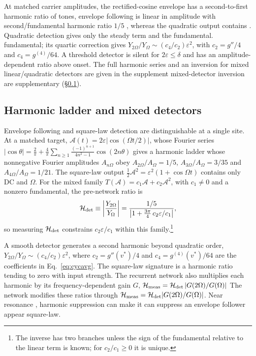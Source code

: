 \documentclass[11pt,a4paper]{article}
\newif\ifjne
\newcommand{\half}{\tfrac{1}{2}}
\providecommand{\DIFaddtex}[1]{{\protect\color{blue} \sf #1}} %
\providecommand{\DIFdeltex}[1]{{\protect\color{red} \scriptsize #1}} %
\providecommand{\DIFaddbegin}{} %
\providecommand{\DIFaddend}{} %
\providecommand{\DIFdelbegin}{} %
\providecommand{\DIFdelend}{} %
\providecommand{\DIFadd}[1]{\texorpdfstring{\DIFaddtex{#1}}{#1}} %
\providecommand{\DIFdel}[1]{\texorpdfstring{\DIFdeltex{#1}}{}} %
\begin{document}
At matched \DIFdelbegin \DIFdel{carrier amplitudes, the rectified-cosine envelope has a
second-to-first harmonic ratio of }\DIFdelend \DIFaddbegin \DIFadd{tones, envelope following is linear in amplitude with
second/fundamental harmonic ratio }\DIFaddend $1/5$\DIFdelbegin \DIFdel{, whereas the quadratic output contains
}\DIFdelend \DIFaddbegin \DIFadd{. Quadratic detection gives }\DIFaddend only
the steady term and \DIFdelbegin \DIFdel{the fundamental. }\DIFdelend \DIFaddbegin \DIFadd{fundamental; its quartic correction gives
$Y_{2\Omega}/Y_\Omega\sim(c_4/c_2)\varepsilon^2$, with
$c_2=g''/4$ and $c_4=g^{(4)}/64$. A threshold detector is silent for
$2\varepsilon\le\delta$ and has an amplitude-dependent ratio above onset.
}\DIFaddend The full harmonic series and \DIFdelbegin \DIFdel{an
inversion for mixed linear/quadratic detectors are given in the supplement
}\DIFdelend \DIFaddbegin \DIFadd{mixed-detector inversion are supplementary
}\DIFaddend (\S\ref{supp:harmonics}).
\ifjne\else
\subsection{Harmonic ladder and mixed detectors}\label{supp:harmonics}
Envelope following and square-law detection are distinguishable at a single site. At a matched target,
$\mathcal A(t)=2\varepsilon|\cos(\Omega t/2)|$, whose Fourier series
$|\cos\theta|=\tfrac2\pi+\tfrac4\pi\sum_{n\ge1}\tfrac{(-1)^{n+1}}{4n^2-1}\cos(2n\theta)$ gives a
harmonic ladder whose nonnegative Fourier amplitudes $A_{n\Omega}$ obey $A_{2\Omega}/A_\Omega=1/5$, $A_{3\Omega}/A_\Omega=3/35$ and
$A_{4\Omega}/A_\Omega=1/21$. The square-law output $\half \mathcal A^2=\varepsilon^2(1+\cos\Omega
t)$ contains only DC and $\Omega$. For the mixed family $T(\mathcal A)=c_1\mathcal A+c_2\mathcal A^2$, with
$c_1\ne0$ and a nonzero fundamental, the
pre-network ratio is
\begin{equation}
\mathcal H_{\rm det}\equiv\left|\frac{Y_{2\Omega}}{Y_\Omega}\right|
=\frac{1/5}{\left|1+\tfrac{3\pi}{4}\,c_2\varepsilon/c_1\right|},
\label{eq:rdet}
\end{equation}
so measuring $\mathcal H_{\rm det}$ constrains $c_2\varepsilon/c_1$ within this family.\footnote{The inverse has two branches unless the sign of the fundamental
relative to the linear term is known; for $c_2/c_1\ge0$ it is unique.}

\fi

\DIFdelbegin \DIFdel{A smooth detector generates a second harmonic beyond quadratic order,
$Y_{2\Omega}/Y_\Omega\sim(c_4/c_2)\varepsilon^2$, where
$c_2=g''(v^*)/4$ and $c_4=g^{(4)}(v^*)/64$ are the coefficients in
Eq.~\eqref{eq:cycavg}. The square-law signature is a harmonic ratio tending to zero with input strength. The recurrent
network also multiplies each harmonic by its frequency-dependent gain $G$,
$\mathcal H_{\rm meas}=\mathcal H_{\rm det}\,|G(2\Omega)/G(\Omega)|$}\DIFdelend \DIFaddbegin \DIFadd{The network modifies these ratios through
$\mathcal H_{\rm meas}=\mathcal H_{\rm det}|G(2\Omega)/G(\Omega)|$}\DIFaddend .
Near resonance \DIFdelbegin \DIFdel{, harmonic suppression can make }\DIFdelend \DIFaddbegin \DIFadd{it can suppress }\DIFaddend an envelope follower\DIFdelbegin \DIFdel{appear square-law. }%
\end{document}
